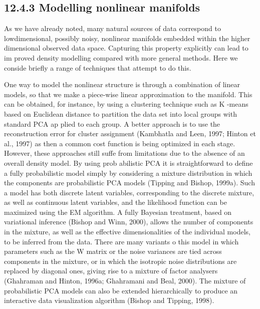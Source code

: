 \documentclass[
  10
]{article}
\begin{document}
\subsection{12.4.3 Modelling nonlinear
manifolds}\label{modelling-nonlinear-manifolds}

As we have already noted, many natural sources of data correspond to
lowdimensional, possibly noisy, nonlinear manifolds embedded within the
higher dimensional observed data space. Capturing this property
explicitly can lead to im proved density modelling compared with more
general methods. Here we conside briefly a range of techniques that
attempt to do this.

One way to model the nonlinear structure is through a combination of
linear models, so that we make a piece-wise linear approximation to the
manifold. This can be obtained, for instance, by using a clustering
technique such as K -means based on Euclidean distance to partition the
data set into local groups with standard PCA ap plied to each group. A
better approach is to use the reconstruction error for cluster
assignment (Kambhatla and Leen, 1997; Hinton et al., 1997) as then a
common cost function is being optimized in each stage. However, these
approaches still suffe from limitations due to the absence of an overall
density model. By using prob abilistic PCA it is straightforward to
define a fully probabilistic model simply by considering a mixture
distribution in which the components are probabilistic PCA models
(Tipping and Bishop, 1999a). Such a model has both discrete latent
variables, corresponding to the discrete mixture, as well as continuous
latent variables, and the likelihood function can be maximized using the
EM algorithm. A fully Bayesian treatment, based on variational inference
(Bishop and Winn, 2000), allows the number of components in the mixture,
as well as the effective dimensionalities of the individual models, to
be inferred from the data. There are many variants o this model in which
parameters such as the W matrix or the noise variances are tied across
components in the mixture, or in which the isotropic noise distributions
are replaced by diagonal ones, giving rise to a mixture of factor
analysers (Ghahraman and Hinton, 1996a; Ghahramani and Beal, 2000). The
mixture of probabilistic PCA models can also be extended hierarchically
to produce an interactive data visualization algorithm (Bishop and
Tipping, 1998).
\end{document}
